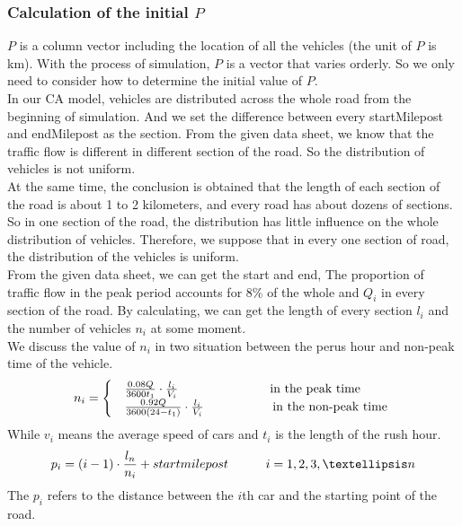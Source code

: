 \documentclass{mcmthesis}
\begin{document}
\subsubsection{Calculation of the initial $P$}
\indent $P$ is a column vector including the location of all the vehicles (the unit of $P$ is km). With the process of simulation, $P$ is a vector that varies orderly. So we only need to consider how to determine the initial value of $P$.\\
\indent In our CA model, vehicles are distributed across the whole road from the beginning of simulation. And we set the difference between every startMilepost and endMilepost as the section. From the given data sheet, we know that the traffic flow is different in different section of the road. So the distribution of vehicles is not uniform.\\
\indent At the same time, the conclusion is obtained that the length of each section of the road is about 1 to 2 kilometers, and every road has about dozens of sections. So in one section of the road, the distribution has little influence on the whole distribution of vehicles. Therefore, we suppose that in every one section of road, the distribution of the vehicles is uniform. \\
\indent From the given data sheet, we can get the start and end, The proportion of traffic flow in the peak period accounts for 8\% of the whole and $Q_{i}$ in every section of the road. By calculating, we can get the length of every section $l_{i}$ and the number of vehicles $n_{i}$ at some moment.\\
\indent We discuss the value of $n_{i}$ in two situation between the perus hour and non-peak time of the vehicle. 
\begin{equation}
	n_{i}=\begin{cases}
	&\frac{0.08Q}{3600t_{1}}\cdot\frac{l_{i}}{V_{i}} \indent\indent\indent \indent\quad\text{\,\,in the peak time }\\ 
	&\frac{0.92Q}{3600(24-t_{1})}\cdot\frac{l_{i}}{V_{i}}\indent\indent\indent \quad\text{in the non-peak time } 
	\end{cases}
\end{equation}
\indent While $v_{i}$ means the average speed of cars and $t_{i}$ is the length of the rush hour.\\
\begin{equation}
	p_i=(i-1)\cdot\frac{l_{n}}{n_{i}}+startmilepost \indent \indent	i=1,2,3,…n
\end{equation}
\indent The $p_{i}$ refers to the distance between the $i$th car and the starting point of the road.
\end{document}
